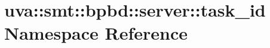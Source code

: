 \hypertarget{namespaceuva_1_1smt_1_1bpbd_1_1server_1_1task__id}{}\section{uva\+:\+:smt\+:\+:bpbd\+:\+:server\+:\+:task\+\_\+id Namespace Reference}
\label{namespaceuva_1_1smt_1_1bpbd_1_1server_1_1task__id}
